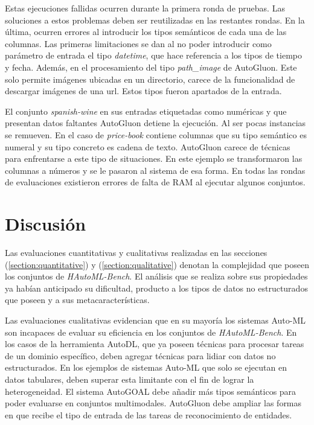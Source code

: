 Estas ejecuciones fallidas ocurren durante la primera ronda de pruebas. Las soluciones a estos problemas deben ser reutilizadas en las restantes rondas. 
En la última, ocurren errores al introducir los tipos semánticos de cada una de las columnas. Las primeras limitaciones se dan al no poder introducir como 
parámetro de entrada el tipo \textit{datetime}, que hace referencia a los tipos de tiempo y fecha. Además, en el procesamiento del tipo \textit{path\_image} de AutoGluon. 
Este solo permite imágenes ubicadas en un directorio, carece de la funcionalidad de descargar imágenes de una url. Estos tipos fueron apartados de la entrada.

El conjunto \textit{spanish-wine} en sus entradas etiquetadas como numéricas y que presentan datos faltantes AutoGluon detiene la ejecución. Al ser pocas instancias 
se remueven.
En el caso de \textit{price-book} contiene columnas que su tipo semántico es numeral y su tipo concreto es cadena de texto. AutoGluon carece de técnicas para 
enfrentarse a este tipo de situaciones. En este ejemplo se transformaron las columnas a números y se le pasaron al sistema de esa forma.
En todas las rondas de evaluaciones existieron errores de falta de RAM al ejecutar algunos conjuntos.

\section{Discusión}\label{subsection:discussions}

Las evaluaciones cuantitativas y cualitativas realizadas en las secciones (\ref{section:quantitative}) y (\ref{section:qualitative}) denotan la complejidad que poseen 
los conjuntos de \textit{HAutoML-Bench}.
El análisis que se realiza sobre sus propiedades ya habían anticipado su dificultad, producto a los tipos de datos no estructurados que poseen y a sus 
metacaracterísticas.

Las evaluaciones cualitativas evidencian que en su mayoría los sistemas Auto-ML son incapaces de evaluar su eficiencia en los conjuntos de \textit{HAutoML-Bench}. 
En los casos de la herramienta AutoDL, que ya poseen técnicas para procesar tareas de un dominio específico, deben agregar técnicas para lidiar con datos no estructurados. 
En los ejemplos de sistemas Auto-ML que solo se ejecutan en datos tabulares, deben superar esta limitante con el fin de lograr la heterogeneidad. 
El sistema AutoGOAL debe añadir más tipos semánticos para poder evaluarse en conjuntos multimodales. AutoGluon debe ampliar las formas en que recibe el tipo de entrada 
de las tareas de reconocimiento de entidades.

